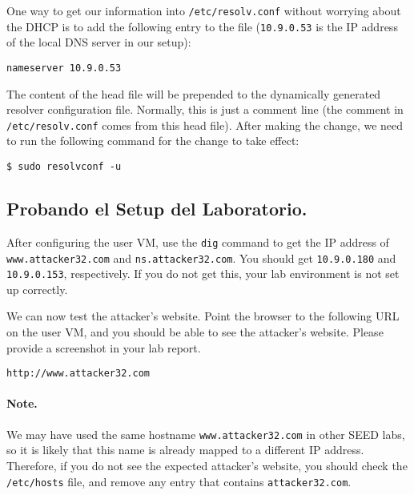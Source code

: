 One way to get our information into \texttt{/etc/resolv.conf} without worrying about
the DHCP is to add the following entry to the 
file (\texttt{10.9.0.53} is the IP address of the local DNS server in our setup):

\begin{lstlisting}
nameserver 10.9.0.53
\end{lstlisting}

The content of the head file will be prepended to the dynamically generated resolver
configuration file. Normally, this is just a comment line (the comment in
\texttt{/etc/resolv.conf} comes from this head file). After making the change,
we need to run the following command for the change to take effect: 

\begin{lstlisting}
$ sudo resolvconf -u
\end{lstlisting}




\subsection{Probando el Setup del Laboratorio.}

After configuring the user VM, use the \texttt{dig} command
to get the IP address of \texttt{www.attacker32.com}
and \texttt{ns.attacker32.com}. You should get 
\texttt{10.9.0.180} and \texttt{10.9.0.153}, respectively. 
If you do not get this, your lab environment is not 
set up correctly. 


We can now test the attacker's website. 
Point the browser to the following URL on the user VM, and you should 
be able to see the attacker's website. 
Please provide a screenshot in your lab report. 

\begin{lstlisting}
http://www.attacker32.com
\end{lstlisting}

\paragraph{Note.} We may have used the same hostname  
\texttt{www.attacker32.com} in other SEED labs, so it is likely 
that this name is already mapped to a different IP address. Therefore,
if you do not see the expected attacker's website, you should 
check the \texttt{/etc/hosts} file, and remove
any entry that contains \texttt{attacker32.com}. 




